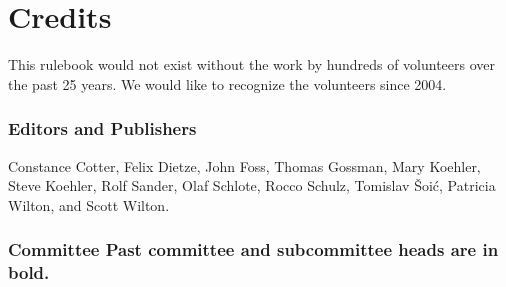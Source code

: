 \renewcommand\thepart{} %
\renewcommand\partname{} %
\part{Credits}
This rulebook would not exist without the work by hundreds of volunteers over the past 25 years.
We would like to recognize the volunteers since 2004.

\section*{Editors and Publishers}
\begingroup
\fontsize{10pt}{10pt}\selectfont
Constance Cotter,
Felix Dietze,
John Foss,
Thomas Gossman,
Mary  Koehler,
Steve Koehler,
Rolf Sander,
Olaf Schlote,
Rocco Schulz,
Tomislav Šoić,
Patricia Wilton,
and Scott Wilton.
\endgroup

\section*{Committee \textnormal{\small \quad Past committee and subcommittee heads are in bold.}}

